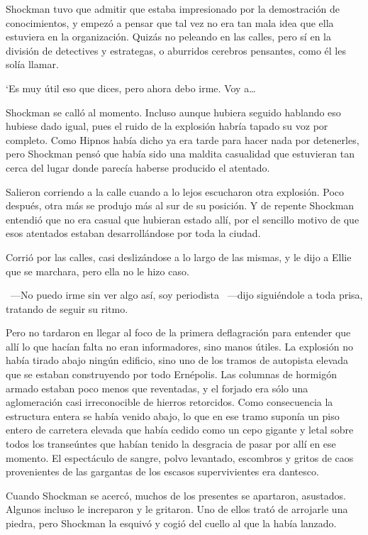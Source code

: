 Shockman tuvo que admitir que estaba impresionado por la demostración de conocimientos, y empezó a pensar que tal vez no era tan mala idea que ella estuviera en la organización. Quizás no peleando en las calles, pero sí en la división de detectives y estrategas, o aburridos cerebros pensantes, como él les solía llamar.

‘Es muy útil eso que dices, pero ahora debo irme. Voy a\dots

Shockman se calló al momento. Incluso aunque hubiera seguido hablando eso hubiese dado igual, pues el ruido de la explosión habría tapado su voz por completo. Como Hipnos había dicho ya era tarde para hacer nada por detenerles, pero Shockman pensó que había sido una maldita casualidad que estuvieran tan cerca del lugar donde parecía haberse producido el atentado.

Salieron corriendo a la calle cuando a lo lejos escucharon otra explosión. Poco después, otra más se produjo más al sur de su posición. Y de repente Shockman entendió que no era casual que hubieran estado allí, por el sencillo motivo de que esos atentados estaban desarrollándose por toda la ciudad.

Corrió por las calles, casi deslizándose a lo largo de las mismas, y le dijo a Ellie que se marchara, pero ella no le hizo caso.

~---No puedo irme sin ver algo así, soy periodista ~---dijo siguiéndole a toda prisa, tratando de seguir su ritmo.

Pero no tardaron en llegar al foco de la primera deflagración para entender que allí lo que hacían falta no eran informadores, sino manos útiles. La explosión no había tirado abajo ningún edificio, sino uno de los tramos de autopista elevada que se estaban construyendo por todo Ernépolis. Las columnas de hormigón armado estaban poco menos que reventadas, y el forjado era sólo una aglomeración casi irreconocible de hierros retorcidos. Como consecuencia la estructura entera se había venido abajo, lo que en ese tramo suponía un piso entero de carretera elevada que había cedido como un cepo gigante y letal sobre todos los transeúntes que habían tenido la desgracia de pasar por allí en ese momento. El espectáculo de sangre, polvo levantado, escombros y gritos de caos provenientes de las gargantas de los escasos supervivientes era dantesco.

Cuando Shockman se acercó, muchos de los presentes se apartaron, asustados. Algunos incluso le increparon y le gritaron. Uno de ellos trató de arrojarle una piedra, pero Shockman la esquivó y cogió del cuello al que la había lanzado.


